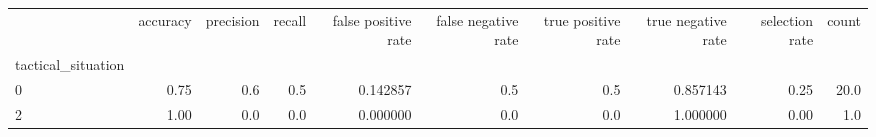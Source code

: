 \begin{tabular}{lrrrrrrrrr}
\toprule
{} &  accuracy &  precision &  recall &  false positive rate &  false negative rate &  true positive rate &  true negative rate &  selection rate &  count \\
tactical\_situation &           &            &         &                      &                      &                     &                     &                 &        \\
\midrule
0                  &      0.75 &        0.6 &     0.5 &             0.142857 &                  0.5 &                 0.5 &            0.857143 &            0.25 &   20.0 \\
2                  &      1.00 &        0.0 &     0.0 &             0.000000 &                  0.0 &                 0.0 &            1.000000 &            0.00 &    1.0 \\
\bottomrule
\end{tabular}
